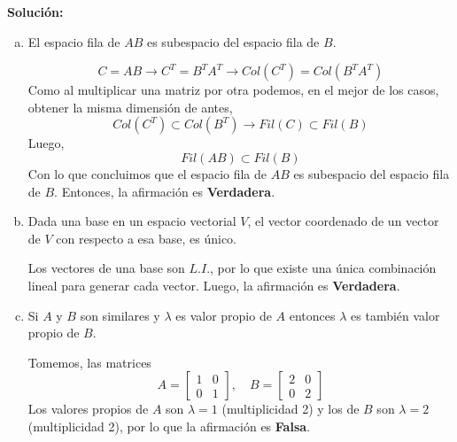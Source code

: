 \documentclass[12pt]{article}
\newenvironment{solucion}
{\begin{mdframed}[backgroundcolor=black!10]
		{\bf Solución:}\\
	}
	{
	\end{mdframed}
}
\newenvironment{preguntas}
{\begin{enumerate}\itemsep12pt
	}
	{
	\end{enumerate}
}
\newcommand{\ra}{\rightarrow}
\begin{document}
\begin{preguntas}
\begin{solucion}
\begin{enumerate}[a)]
\item El espacio fila de $AB$ es subespacio del espacio fila de $B$.
			
			$$C = AB  \ra C^T = B^TA^T \ra Col(C^T) = Col(B^TA^T)$$
			Como al multiplicar una matriz por otra podemos, en el mejor de los casos, obtener la misma dimensión de antes,
			$$Col(C^T) \subset Col(B^T) \ra Fil(C) \subset Fil(B)$$
			Luego,
			$$Fil(AB) \subset Fil(B)$$
			Con lo que concluimos que el espacio fila de $AB$ es subespacio del espacio fila de $B$. Entonces, la afirmación es {\bf Verdadera}.
\item Dada una base en un espacio vectorial $V$, el vector coordenado de un vector de $V$ con respecto a esa base, es único.
			
			Los vectores de una base son $L.I.$, por lo que existe una única combinación lineal para generar cada vector. Luego, la afirmación es {\bf Verdadera}.
\item Si $A$ y $B$ son similares y $\lambda$ es valor propio de $A$ entonces $\lambda$ es también valor propio de $B$.
			
			Tomemos, las matrices
			$$A = \begin{bmatrix}
			1 & 0 \\ 0 & 1
			\end{bmatrix}, \quad 
			B = \begin{bmatrix}
			2 & 0 \\ 0 & 2
			\end{bmatrix}$$
			Los valores propios de $A$ son $\lambda = 1$ (multiplicidad 2) y los de $B$ son $\lambda = 2$ (multiplicidad 2), por lo que la afirmación es {\bf Falsa}.
\end{enumerate}
\end{solucion}
\end{preguntas}
\end{document}
